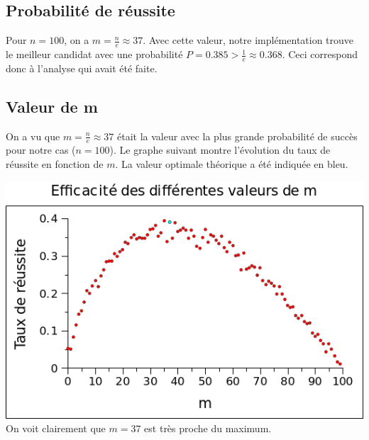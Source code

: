 \documentclass[a4paper,10pt]{article}
\begin{document}
\subsection{Probabilité de réussite}
Pour
\begin{math}n = 100\end{math},
on a
\begin{math}m = \frac{n}{e} \approx 37\end{math}.
Avec cette valeur, notre implémentation trouve le meilleur candidat avec
une probabilité
\begin{math}P = 0.385 > \frac{1}{e} \approx 0.368\end{math}.
Ceci correspond donc à l'analyse qui avait été faite.

\subsection{Valeur de m}
On a vu que
\begin{math}m = \frac{n}{e} \approx 37\end{math}
était la valeur avec la plus grande probabilité de succès pour notre cas
(\begin{math}n = 100\end{math}).
Le graphe suivant montre l'évolution du taux de réussite en fonction de
\begin{math}m\end{math}. 
La valeur optimale théorique a été indiquée en bleu.

\includegraphics[scale=0.5]{../success_m_graph.png}\\

On voit clairement que
\begin{math}m = 37\end{math}
est très proche du maximum.\\
\end{document}
